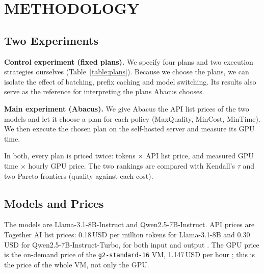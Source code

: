 \documentclass[a4paper,12pt]{report}
\newcommand{\code}[1]{\texttt{#1}}
\begin{document}
\chapter{METHODOLOGY}

\section{Two Experiments}

\textbf{Control experiment (fixed plans).} We specify four plans and two execution strategies
ourselves (Table~\ref{table:plans}). Because we choose the plans, we can isolate the effect of
batching, prefix caching and model switching. Its results also serve as the reference for
interpreting the plans Abacus chooses.

\textbf{Main experiment (Abacus).} We give Abacus the API list prices of the two models and let it
choose a plan for each policy (MaxQuality, MinCost, MinTime). We then execute the chosen plan on the
self-hosted server and measure its GPU time.

In both, every plan is priced twice: tokens $\times$ API list price, and measured GPU time $\times$
hourly GPU price. The two rankings are compared with Kendall's $\tau$ and two Pareto frontiers
(quality against each cost).

\section{Models and Prices}

The models are Llama-3.1-8B-Instruct and Qwen2.5-7B-Instruct. API prices are Together AI list
prices: 0.18\,USD per million tokens for Llama-3.1-8B and 0.30\,USD for Qwen2.5-7B-Instruct-Turbo,
for both input and output \cite{togetherllama, togetherqwen}. The GPU price is the on-demand price
of the \code{g2-standard-16} VM, 1.147\,USD per hour \cite{gcppricing}; this is the price of the whole
VM, not only the GPU.
\end{document}
